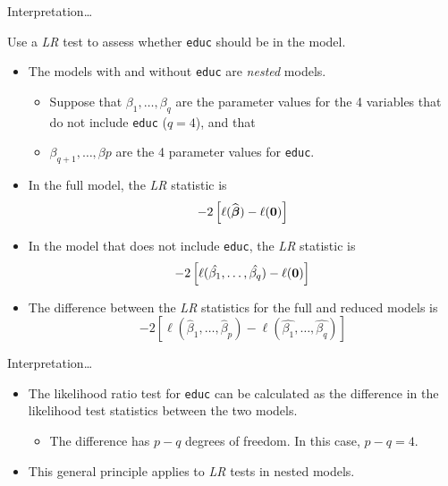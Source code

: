 \documentclass[ignorenonframetext,]{beamer}
\providecommand{\tightlist}{%
  \setlength{\itemsep}{0pt}\setlength{\parskip}{0pt}}
\newcommand{\bbeta}{\mbox{\boldmath$\beta$}}
\begin{document}
\begin{frame}{%
\protect\hypertarget{interpretation-4}{%
Interpretation\ldots}}

Use a \emph{LR} test to assess whether \texttt{educ} should be in the
model.

\begin{itemize}
\item
  The models with and without \texttt{educ} are \emph{nested} models.

  \begin{itemize}
  \item
    Suppose that \(\beta_1,\ldots,\beta_q\) are the parameter values for
    the 4 variables that do not include \texttt{educ} (\(q = 4\)), and
    that
  \item
    \(\beta_{q+1}, \ldots, \beta{p}\) are the 4 parameter values for
    \texttt{educ}.\\
  \end{itemize}
\item
  In the full model, the \emph{LR} statistic is
  \[-2\left[\ell(\widehat{\bbeta}) - \ell({\bf 0})\right]\]
\item
  In the model that does not include \texttt{educ}, the \emph{LR}
  statistic is
  \[-2\left[\ell(\hat{\beta_1},\dots,\hat{\beta_q}) - \ell({\bf 0})\right]\]
\item
  The difference between the \emph{LR} statistics for the full and
  reduced models is
  \[-2\left[\ell(\hat{\beta}_1, \ldots, \hat{\beta}_p) - \ell(\hat{\beta_1},\dots,\hat{\beta_q}) \right] \]
\end{itemize}

\end{frame}

\begin{frame}{%
\protect\hypertarget{interpretation-5}{%
Interpretation\ldots}}

\begin{itemize}
\item
  The likelihood ratio test for \texttt{educ} can be calculated as the
  difference in the likelihood test statistics between the two models.

  \begin{itemize}
  \tightlist
  \item
    The difference has \(p-q\) degrees of freedom. In this case,
    \(p - q = 4\).
  \end{itemize}
\item
  This general principle applies to \emph{LR} tests in nested models.
\end{itemize}

\end{frame}
\end{document}
